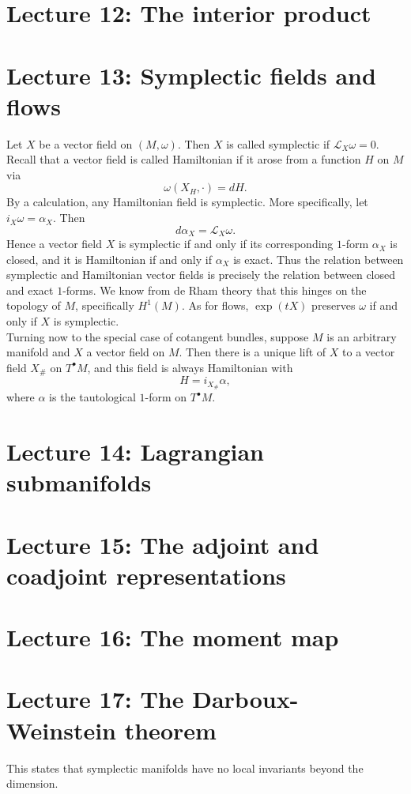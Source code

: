 \documentclass[11pt]{article} %
\begin{document}
\section*{Lecture 12: The interior product}


\section*{Lecture 13: Symplectic fields and flows}
Let $X$ be a vector field on $(M,\omega)$. Then $X$ is called symplectic if $\mathscr{L}_X \omega = 0$. Recall that a vector field is called Hamiltonian if it arose from a function $H$ on $M$ via
$$
\omega (X_H, \cdot) = dH.
$$
By a calculation, any Hamiltonian field is symplectic. More specifically, let $i_X\omega = \alpha_X$. Then
$$
d\alpha_X = \mathscr{L}_X \omega.
$$
Hence a vector field $X$ is symplectic if and only if its corresponding $1$-form $\alpha_X$ is closed, and it is Hamiltonian if and only if $\alpha_X$ is exact. Thus the relation between symplectic and Hamiltonian vector fields is precisely the relation between closed and exact $1$-forms. We know from de Rham theory that this hinges on the topology of $M$, specifically $H^1(M)$. As for flows, $\operatorname{exp}(tX)$ preserves $\omega$ if and only if $X$ is symplectic. \\
Turning now to the special case of cotangent bundles, suppose $M$ is an arbitrary manifold and $X$ a vector field on $M$. Then there is a unique lift of $X$ to a vector field $X_\#$ on $T^\bullet M$, and this field is always Hamiltonian with 
$$
H = i_{X_\#}\alpha,
$$
where $\alpha$ is the tautological $1$-form on $T^\bullet M$.


\section*{Lecture 14: Lagrangian submanifolds}


\section*{Lecture 15: The adjoint and coadjoint representations}

\section*{Lecture 16: The moment map} 

\section*{Lecture 17: The Darboux-Weinstein theorem}
This states that symplectic manifolds have no local invariants beyond the dimension. 
\end{document}
